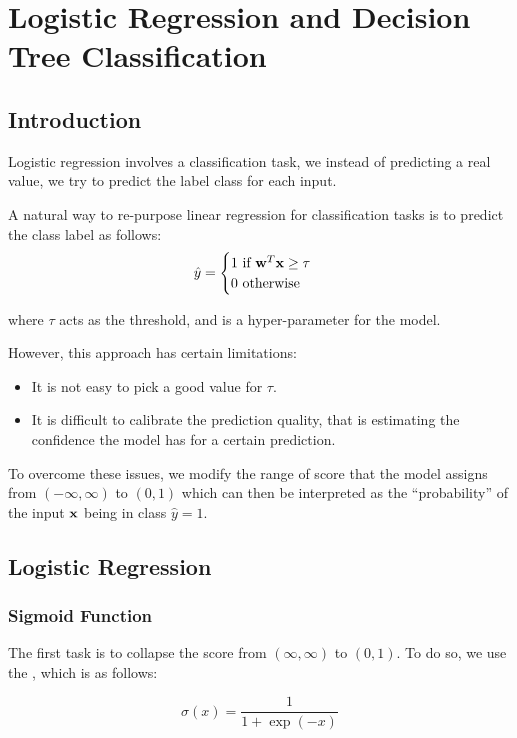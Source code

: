

\chapter{Logistic Regression and Decision Tree Classification}
\section{Introduction}

Logistic regression involves a classification task, we instead of predicting a real value, we try to predict the label class for each input.

A natural way to re-purpose linear regression for classification tasks is to predict the class label as follows:
$$
  \hat{y} = \begin{cases}
    1 \ \text{if} \ \textbf{w}^T \textbf{x} \geq \tau \\
    0 \ \text{otherwise}
  \end{cases}
$$

where $\tau$ acts as the threshold, and is a hyper-parameter for the model.

However, this approach has certain limitations:

\begin{itemize}
  \item It is not easy to pick a good value for $\tau$.
  \item It is difficult to calibrate the prediction quality, that is estimating the confidence the model has for a certain prediction.
\end{itemize}

To overcome these issues, we modify the range of score that the model assigns from $(-\infty, \infty)$ to $(0, 1)$ which can then be interpreted as the ``probability'' of the input $\textbf{x}$ being in class $\hat{y} = 1$.

\section{Logistic Regression}

\subsection{Sigmoid Function}

The first task is to collapse the score from $(\infty, \infty)$ to $(0, 1)$. To do so, we use the , which is as follows:

\begin{equation*}
  \boxed{\sigma(x) = \frac{1}{1 + \exp(-x)}}
\end{equation*}

